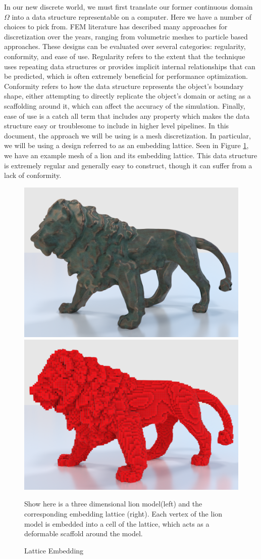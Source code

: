 In our new discrete world, we must first translate our former
continuous domain $\Omega$ into a data structure representable on a
computer. Here we have a number of choices to pick from. FEM
literature has described many approaches for discretization over the
years, ranging from volumetric meshes to particle based
approaches. These designs can be evaluated over several categories:
regularity, conformity, and ease of use. Regularity refers to the
extent that the technique uses repeating data structures or provides
implicit internal relationships that can be predicted, which is often
extremely beneficial for performance optimization. Conformity refers
to how the data structure represents the object's boundary shape,
either attempting to directly replicate the object's domain or acting
as a scaffolding around it, which can affect the accuracy of the
simulation. Finally, ease of use is a catch all term that includes any
property which makes the data structure easy or troublesome to include
in higher level pipelines. In this document, the approach we will be
using is a mesh discretization. In particular, we will be using a
design referred to as an embedding lattice. Seen in Figure
\ref{fig:embeddingexample}, we have an example mesh of a lion and its embedding lattice. This data structure is extremely regular
and generally easy to construct, though it can suffer from a lack of
conformity.

\begin{figure}[t]
  \includegraphics[width=.5\textwidth]{other_images/LionStatue.png}
  \includegraphics[width=.5\textwidth]{other_images/LionLattice.png}
  \vspace*{-.3in}
   \caption{Lattice Embedding}{Show here is a three dimensional lion
     model\footnotemark (left) and the corresponding embedding lattice
     (right). Each vertex of the lion model is embedded into a cell of
   the lattice, which acts as a deformable scaffold around the model.}
   \label{fig:embeddingexample}
   \vspace*{-.15in}
\end{figure}

